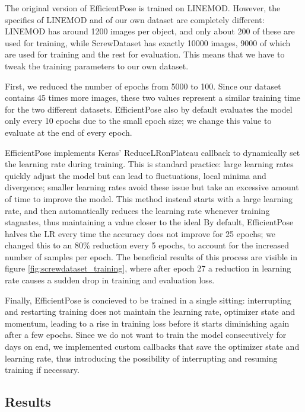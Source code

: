 The original version of EfficientPose is trained on LINEMOD. However, the specifics of LINEMOD and of our own dataset are completely different: LINEMOD has around 1200 images per object, and only about 200 of these are used for training, while ScrewDataset has exactly 10000 images, 9000 of which are used for training and the rest for evaluation. This means that we have to tweak the training parameters to our own dataset.

First, we reduced the number of epochs from 5000 to 100. Since our dataset contains 45 times more images, these two values represent a similar training time for the two different datasets. EfficientPose also by default evaluates the model only every 10 epochs due to the small epoch size; we change this value to evaluate at the end of every epoch.

EfficientPose implements Keras' ReduceLRonPlateau callback to dynamically set the learning rate during training. This is standard practice: large learning rates quickly adjust the model but can lead to fluctuations, local minima and divergence; smaller learning rates avoid these issue but take an excessive amount of time to improve\cite{ReduceLR} the model. This method instead starts with a large learning rate, and then automatically reduces the learning rate whenever training stagnates, thus maintaining a value closer to the ideal By default, EfficientPose halves the LR every time the accuracy does not improve for 25 epochs; we changed this to an 80\% reduction every 5 epochs, to account for the increased number of samples per epoch. The beneficial results of this process are visible in figure \ref{fig:screwdataset_training}, where after epoch 27 a reduction in learning rate causes a sudden drop in training and evaluation loss.

Finally, EfficientPose is concieved to be trained in a single sitting: interrupting and restarting training does not maintain the learning rate, optimizer state and momentum, leading to a rise in training loss before it starts diminishing again after a few epochs. Since we do not want to train the model consecutively for days on end, we implemented custom callbacks that save the optimizer state and learning rate, thus introducing the possibility of interrupting and resuming training if necessary.

\subsection{Results}

